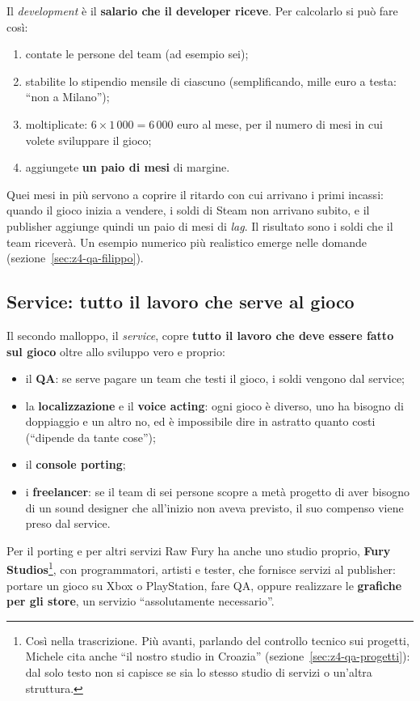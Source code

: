 Il \emph{development} è il \textbf{salario che il developer riceve}. Per
calcolarlo si può fare così:
\begin{enumerate}
  \item contate le persone del team (ad esempio sei);
  \item stabilite lo stipendio mensile di ciascuno (semplificando, mille euro
        a testa: ``non a Milano'');
  \item moltiplicate: \(6 \times 1\,000 = 6\,000\) euro al mese, per il numero
        di mesi in cui volete sviluppare il gioco;
  \item aggiungete \textbf{un paio di mesi} di margine.
\end{enumerate}
Quei mesi in più servono a coprire il ritardo con cui arrivano i primi
incassi: quando il gioco inizia a vendere, i soldi di Steam non arrivano
subito, e il publisher aggiunge quindi un paio di mesi di \emph{lag}. Il
risultato sono i soldi che il team riceverà. Un esempio numerico più
realistico emerge nelle domande (sezione~\ref{sec:z4-qa-filippo}).

\subsection{Service: tutto il lavoro che serve al gioco}

Il secondo malloppo, il \emph{service}, copre \textbf{tutto il lavoro che
deve essere fatto sul gioco} oltre allo sviluppo vero e proprio:
\begin{itemize}
  \item il \textbf{QA}: se serve pagare un team che testi il gioco, i soldi
        vengono dal service;
  \item la \textbf{localizzazione} e il \textbf{voice acting}: ogni gioco è
        diverso, uno ha bisogno di doppiaggio e un altro no, ed è impossibile
        dire in astratto quanto costi (``dipende da tante cose'');
  \item il \textbf{console porting};
  \item i \textbf{freelancer}: se il team di sei persone scopre a metà
        progetto di aver bisogno di un sound designer che all'inizio non aveva
        previsto, il suo compenso viene preso dal service.
\end{itemize}
Per il porting e per altri servizi Raw Fury ha anche uno studio proprio,
\textbf{Fury Studios}\footnote{Così nella trascrizione. Più avanti, parlando
del controllo tecnico sui progetti, Michele cita anche ``il nostro studio in
Croazia'' (sezione~\ref{sec:z4-qa-progetti}): dal solo testo non si capisce se
sia lo stesso studio di servizi o un'altra struttura.}, con programmatori,
artisti e tester, che fornisce servizi al publisher: portare un gioco su Xbox o
PlayStation, fare QA, oppure realizzare le \textbf{grafiche per gli store}, un
servizio ``assolutamente necessario''.

